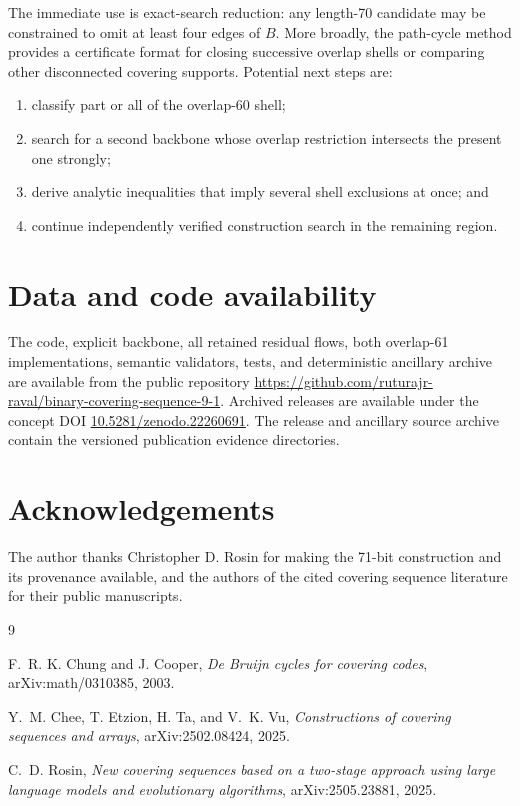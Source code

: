 \documentclass[11pt]{article}
\theoremstyle{definition}
\theoremstyle{remark}
\begin{document}
The immediate use is exact-search reduction: any length-70 candidate may
be constrained to omit at least four edges of $B$.  More broadly, the
path-cycle method provides a certificate format for closing successive
overlap shells or comparing other disconnected covering supports.
Potential next steps are:
\begin{enumerate}
\item classify part or all of the overlap-60 shell;
\item search for a second backbone whose overlap restriction intersects
the present one strongly;
\item derive analytic inequalities that imply several shell exclusions
at once; and
\item continue independently verified construction search in the
remaining region.
\end{enumerate}

\section*{Data and code availability}

The code, explicit backbone, all retained residual flows, both
overlap-61 implementations, semantic validators, tests, and deterministic
ancillary archive are available from the public repository
\url{https://github.com/ruturajr-raval/binary-covering-sequence-9-1}.
Archived releases are available under the concept DOI
\href{https://doi.org/10.5281/zenodo.22260691}
{10.5281/zenodo.22260691}.  The release and ancillary source archive
contain the versioned publication evidence directories.

\section*{Acknowledgements}

The author thanks Christopher D. Rosin for making the 71-bit construction
and its provenance available, and the authors of the cited covering
sequence literature for their public manuscripts.

\begin{thebibliography}{9}

F.~R. K. Chung and J. Cooper,
\emph{De Bruijn cycles for covering codes},
arXiv:math/0310385, 2003.

Y.~M. Chee, T. Etzion, H. Ta, and V.~K. Vu,
\emph{Constructions of covering sequences and arrays},
arXiv:2502.08424, 2025.

C.~D. Rosin,
\emph{New covering sequences based on a two-stage approach using large
language models and evolutionary algorithms},
arXiv:2505.23881, 2025.

\end{thebibliography}
\end{document}
